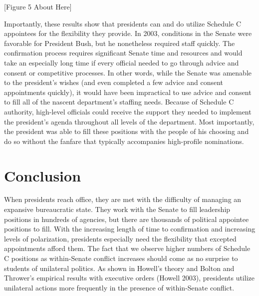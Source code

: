 \documentclass[12pt]{article}
\begin{document}
\begin{center}[Figure 5 About Here]\end{center}

Importantly, these results show that presidents can and do utilize Schedule C appointees for the flexibility they provide. In 2003, conditions in the Senate were favorable for President Bush, but he nonetheless required staff quickly. The confirmation process requires significant Senate time and resources and would take an especially long time if every official needed to go through advice and consent or competitive processes. In other words, while the Senate was amenable to the president's wishes (and even completed a few advice and consent appointments quickly), it would have been impractical to use advice and consent to fill all of the nascent department's staffing needs. Because of Schedule C authority, high-level officials could receive the support they needed to implement the president's agenda throughout all levels of the department. Most importantly, the president was able to fill these positions with the people of his choosing and do so without the fanfare that typically accompanies high-profile nominations. 

\section*{Conclusion}	
When presidents reach office, they are met with the difficulty of managing an expansive bureaucratic state. They work with the Senate to fill leadership positions in hundreds of agencies, but there are thousands of political appointee positions to fill. With the increasing length of time to confirmation and increasing levels of polarization, presidents especially need the flexibility that excepted appointments afford them. The fact that we observe higher numbers of Schedule C positions as within-Senate conflict increases should come as no surprise to students of unilateral politics. As shown in Howell's theory and Bolton and Thrower's empirical results with executive orders (Howell 2003), presidents utilize unilateral actions more frequently in the presence of within-Senate conflict. 

\end{document}
